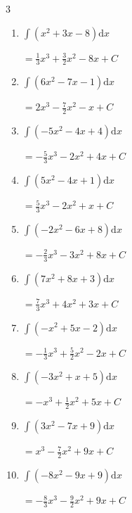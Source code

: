 \begin{multicols}{3}
\begin{enumerate}
        $\displaystyle =\frac{1}{3}x^{3}+ C$

  \item $\displaystyle \int \left( x^{2}+3x-8 \right) \mathrm{d}x$

        $\displaystyle =\frac{1}{3}x^{3}+\frac{3}{2}x^{2}-8x+ C$

  \item $\displaystyle \int \left( 6x^{2}-7x-1 \right) \mathrm{d}x$

        $\displaystyle =2x^{3}-\frac{7}{2}x^{2}-x+ C$

  \item $\displaystyle \int \left( -5x^{2}-4x+4 \right) \mathrm{d}x$

        $\displaystyle =-\frac{5}{3}x^{3}-2x^{2}+4x+ C$

  \item $\displaystyle \int \left( 5x^{2}-4x+1 \right) \mathrm{d}x$

        $\displaystyle =\frac{5}{3}x^{3}-2x^{2}+x+ C$

  \item $\displaystyle \int \left( -2x^{2}-6x+8 \right) \mathrm{d}x$

        $\displaystyle =-\frac{2}{3}x^{3}-3x^{2}+8x+ C$

  \item $\displaystyle \int \left( 7x^{2}+8x+3 \right) \mathrm{d}x$

        $\displaystyle =\frac{7}{3}x^{3}+4x^{2}+3x+ C$

  \item $\displaystyle \int \left( -x^{2}+5x-2 \right) \mathrm{d}x$

        $\displaystyle =-\frac{1}{3}x^{3}+\frac{5}{2}x^{2}-2x+ C$

\columnbreak %

  \item $\displaystyle \int \left( -3x^{2}+x+5 \right) \mathrm{d}x$

        $\displaystyle =-x^{3}+\frac{1}{2}x^{2}+5x+ C$

  \item $\displaystyle \int \left( 3x^{2}-7x+9 \right) \mathrm{d}x$

        $\displaystyle =x^{3}-\frac{7}{2}x^{2}+9x+ C$

  \item $\displaystyle \int \left( -8x^{2}-9x+9 \right) \mathrm{d}x$

        $\displaystyle =-\frac{8}{3}x^{3}-\frac{9}{2}x^{2}+9x+ C$


\end{enumerate}
\end{multicols}
